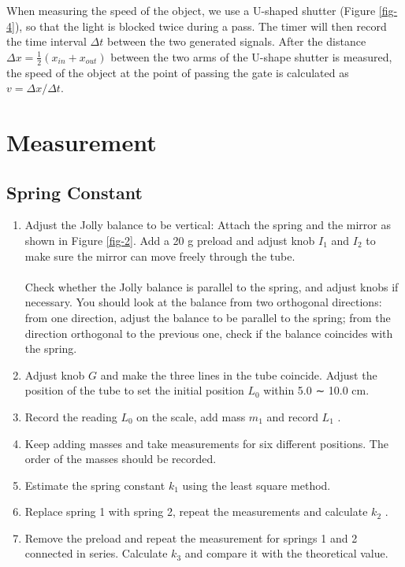 \documentclass{article}
\begin{document}
When measuring the speed of the object, we use a U-shaped shutter (Figure \ref{fig-4}), so
that the light is blocked twice during a pass. The timer will then record the time interval
$\Delta t$ between the two generated signals. After the distance $\Delta x=\frac{1}{2}(x_{in}+x_{out})$ between
the two arms of the U-shape shutter is measured, the speed of the object at the point of
passing the gate is calculated as $v=\Delta x/\Delta t$.

\section{Measurement}

\subsection{Spring Constant}

\begin{enumerate}
\item
Adjust the Jolly balance to be vertical: Attach the spring and the mirror as shown
in Figure \ref{fig-2}. Add a 20 g preload and adjust knob $I_1$ and $I_2$ to make sure the mirror
can move freely through the tube.\\
\\
Check whether the Jolly balance is parallel to the spring, and adjust knobs if necessary. You should look at the balance from two orthogonal directions: from one
direction, adjust the balance to be parallel to the spring; from the direction orthogonal to the previous one, check if the balance coincides with the spring.
\item
Adjust knob $G$ and make the three lines in the tube coincide. Adjust the position
of the tube to set the initial position $L_0$ within 5.0 ∼ 10.0 cm.
\item
Record the reading $L_0$ on the scale, add mass $m_1$ and record $L_1$ .
\item
Keep adding masses and take measurements for six different positions. The order
of the masses should be recorded.
\item
Estimate the spring constant $k_1$ using the least square method.
\item
Replace spring 1 with spring 2, repeat the measurements and calculate $k_2$ .
\item
Remove the preload and repeat the measurement for springs 1 and 2 connected in
series. Calculate $k_3$ and compare it with the theoretical value.
\end{enumerate}
\end{document}
